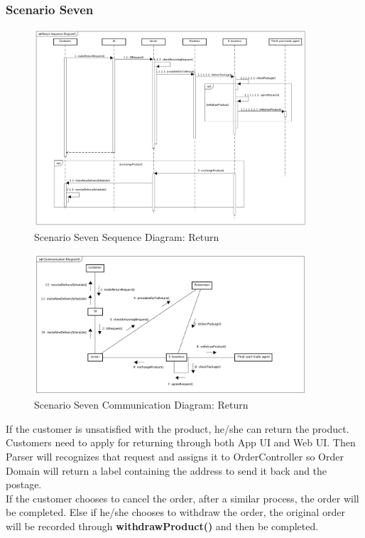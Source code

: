\documentclass[12pt]{scrreprt}
\begin{document}
\subsubsection{Scenario Seven}
\begin{figure}[H]
  \centering\includegraphics[width=4in]{DocumentRes/7SequenceDiagram_return.png}
  \caption{Scenario Seven Sequence Diagram: Return}
\end{figure}
\begin{figure}[H]
  \centering\includegraphics[width=4in]{DocumentRes/7CommunicationDiagram_return.png}
  \caption{Scenario Seven Communication Diagram: Return}
\end{figure}
If the customer is unsatisfied with the product, he/she can return the product. Customers need to apply for returning through both App UI and Web UI. Then Parser will recognizes that request and assigns it to OrderController so Order Domain will return a label containing the address to send it back and the postage.\\
If the customer chooses to cancel the order, after a similar process, the order will be completed. Else if he/she chooses to withdraw the order, the original order will be recorded through \textbf{withdrawProduct()} and then be completed.
\end{document}
